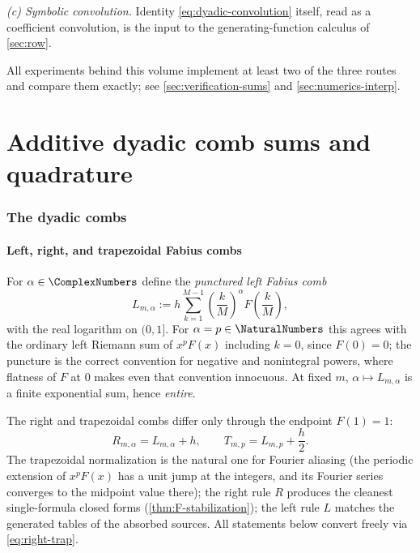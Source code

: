 \emph{(c) Symbolic convolution.}  Identity
\eqref{eq:dyadic-convolution} itself, read as a coefficient convolution,
is the input to the generating-function calculus of
\cref{sec:row}.

All experiments behind this volume implement at least two of the three
routes and compare them exactly; see \cref{sec:verification-sums} and
\cref{sec:numerics-interp}.

\part{Additive dyadic comb sums and quadrature}
\label{part:sums}

\section{The dyadic combs}
\label{sec:combs}

\subsection{Left, right, and trapezoidal Fabius combs}

For $\alpha\in\ComplexNumbers$ define the \emph{punctured left Fabius comb}
\begin{equation}
 L_{m,\alpha}
 :=h\sum_{k=1}^{M-1}
 \left(\frac{k}{M}\right)^{\alpha}F\!\left(\frac{k}{M}\right),
 \label{eq:L-def}
\end{equation}
with the real logarithm on $(0,1]$.  For $\alpha=p\in\NaturalNumbers$ this agrees
with the ordinary left Riemann sum of $x^pF(x)$ including $k=0$, since
$F(0)=0$; the puncture is the correct convention for negative and
nonintegral powers, where flatness of $F$ at $0$ makes even that
convention innocuous.  At fixed $m$, $\alpha\mapsto L_{m,\alpha}$ is a
finite exponential sum, hence \emph{entire}.

The right and trapezoidal combs differ only through the endpoint
$F(1)=1$:
\begin{equation}
 R_{m,\alpha}=L_{m,\alpha}+h,
 \qquad
 T_{m,p}=L_{m,p}+\frac h2.
 \label{eq:right-trap}
\end{equation}
The trapezoidal normalization is the natural one for Fourier aliasing
(the periodic extension of $x^pF(x)$ has a unit jump at the integers,
and its Fourier series converges to the midpoint value there); the
right rule $R$ produces the cleanest single-formula closed forms
(\cref{thm:F-stabilization}); the left rule $L$ matches the generated
tables of the absorbed sources.  All statements below convert freely
via \eqref{eq:right-trap}.

